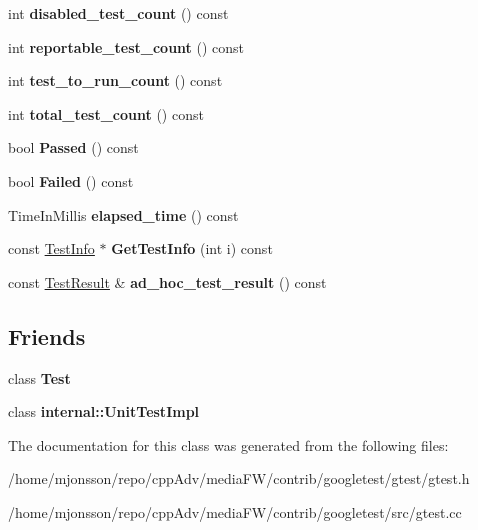 \begin{DoxyCompactItemize}
int {\bfseries disabled\+\_\+test\+\_\+count} () const
\item 
\mbox{\label{classtesting_1_1TestCase_ae4e69f1a77b6aba274981e987e50acab}} 
int {\bfseries reportable\+\_\+test\+\_\+count} () const
\item 
\mbox{\label{classtesting_1_1TestCase_a57f115315eb756e23be6651bb5e6c638}} 
int {\bfseries test\+\_\+to\+\_\+run\+\_\+count} () const
\item 
\mbox{\label{classtesting_1_1TestCase_aba3cab19aaf7295284f0832f2cf895a3}} 
int {\bfseries total\+\_\+test\+\_\+count} () const
\item 
\mbox{\label{classtesting_1_1TestCase_a29bbfd227b732a90198b5280c039c271}} 
bool {\bfseries Passed} () const
\item 
\mbox{\label{classtesting_1_1TestCase_ae71c30eab6f1673b82090a0e745c2aa5}} 
bool {\bfseries Failed} () const
\item 
\mbox{\label{classtesting_1_1TestCase_acd7d6a77bce06da6ef90f5dad1c4def1}} 
Time\+In\+Millis {\bfseries elapsed\+\_\+time} () const
\item 
\mbox{\label{classtesting_1_1TestCase_a441e0eca232643671dc365c2924c255c}} 
const \hyperlink{classtesting_1_1TestInfo}{Test\+Info} $\ast$ {\bfseries Get\+Test\+Info} (int i) const
\item 
\mbox{\label{classtesting_1_1TestCase_a6d5fc5003bc3352f3ddae7dadc6d2364}} 
const \hyperlink{classtesting_1_1TestResult}{Test\+Result} \& {\bfseries ad\+\_\+hoc\+\_\+test\+\_\+result} () const
\end{DoxyCompactItemize}
\subsection*{Friends}
\begin{DoxyCompactItemize}
\item 
\mbox{\label{classtesting_1_1TestCase_a5b78b1c2e1fa07ffed92da365593eaa4}} 
class {\bfseries Test}
\item 
\mbox{\label{classtesting_1_1TestCase_acc0a5e7573fd6ae7ad1878613bb86853}} 
class {\bfseries internal\+::\+Unit\+Test\+Impl}
\end{DoxyCompactItemize}


The documentation for this class was generated from the following files\+:\begin{DoxyCompactItemize}
\item 
/home/mjonsson/repo/cpp\+Adv/media\+F\+W/contrib/googletest/gtest/gtest.\+h\item 
/home/mjonsson/repo/cpp\+Adv/media\+F\+W/contrib/googletest/src/gtest.\+cc\end{DoxyCompactItemize}
